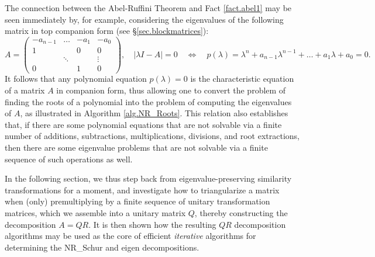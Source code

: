 The connection between the Abel-Ruffini Theorem and Fact \ref{fact.abel1} may be seen immediately by, for example, considering the
eigenvalues of the following matrix in top companion form (see \S \ref{sec.blockmatrices}):
\begin{equation*}
   A=\begin{pmatrix} -a_{n-1} &\ldots &  -a_{1} &  -a_0 \\
                     1        &       & 0         & 0 \\ 
                              &\ddots &           & \vdots \\ 
                     0        &       & 1         & 0 \end{pmatrix}, \quad
  |\lambda I - A|=0 \quad \Leftrightarrow \quad p(\lambda) = \lambda^n + a_{n-1} \lambda^{n-1} + \ldots + a_1 \lambda + a_0 = 0.
\end{equation*}
It follows that any polynomial equation $p(\lambda) = 0$ is the characteristic equation of a matrix $A$ in companion form,
thus allowing one to convert the problem of finding the roots of a polynomial into the problem of computing the eigenvalues of $A$,
as illustrated in Algorithm \ref{alg.NR_Roots}.
This relation also establishes that, if there are some polynomial equations that are not solvable
via a finite number of additions, subtractions, multiplications, divisions, and root extractions,
then there are some eigenvalue problems that are not solvable via a finite sequence of such operations as well.

\begin{figure*}[t]
\end{figure*}

In the following section, we thus step back from eigenvalue-preserving similarity transformations for a moment,
and investigate how to triangularize a matrix when (only) premultiplying by a finite sequence of unitary transformation matrices,
which we assemble into a unitary matrix $Q$, thereby constructing the decomposition $A=QR$.  It is then shown how the
resulting $QR$ decomposition algorithms may be used as the core of efficient {\it iterative} algorithms for determining
the NR_Schur and eigen decompositions.

